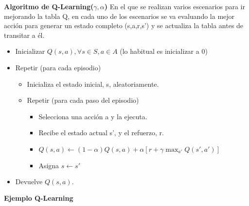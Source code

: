 \documentclass[12pt]{report} %
\begin{document}
\textbf{Algoritmo de Q-Learning($\gamma, \alpha$)}
En el que se realizan varios escenarios para ir mejorando la tabla Q, en cada uno de los escenarios se va evaluando la mejor acción para generar un estado completo (s,a,r,s') y se actualiza la tabla antes de transitar a él.
\begin{itemize}
  \item Inicializar $Q(s, a), \forall s \in S, a \in A$ (lo habitual es inicializar a 0)
  \item Repetir (para cada episodio)
  \begin{itemize}
    \item Inicializa el estado inicial, s, aleatoriamente.
    \item Repetir (para cada paso del episodio)
    \begin{itemize}
      \item Selecciona una acción a y la ejecuta.
      \item Recibe el estado actual s', y el refuerzo, r.
      \item $Q(s,a) \leftarrow (1-\alpha) Q(s,a) + \alpha[r + \gamma \max_{a'} Q(s',a')]$      
      \item Asigna $s \leftarrow s'$
    \end{itemize}
  \end{itemize}
  \item Devuelve $Q(s, a)$.
\end{itemize}

\pagebreak

\textbf{Ejemplo Q-Learning}
\end{document}
